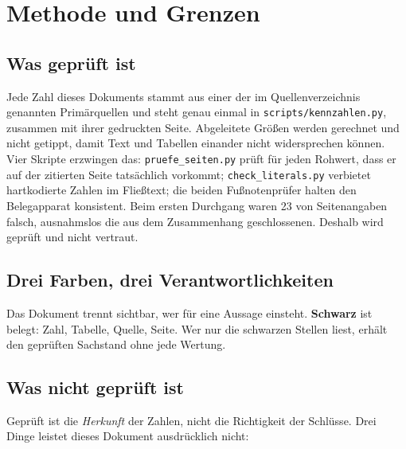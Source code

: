 \section*{Methode und Grenzen}

\subsection*{Was gepr\"uft ist}

Jede Zahl dieses Dokuments stammt aus einer der im Quellenverzeichnis
genannten Prim\"arquellen und steht genau einmal in \texttt{scripts/kennzahlen.py},
zusammen mit ihrer gedruckten Seite. Abgeleitete Gr\"o{\ss}en werden gerechnet und
nicht getippt, damit Text und Tabellen einander nicht widersprechen k\"onnen.
Vier Skripte erzwingen das: \texttt{pruefe\_seiten.py} pr\"uft f\"ur jeden Rohwert,
dass er auf der zitierten Seite tats\"achlich vorkommt; \texttt{check\_literals.py}
verbietet hartkodierte Zahlen im Flie{\ss}text; die beiden Fu{\ss}notenpr\"ufer
halten den Belegapparat konsistent. Beim ersten Durchgang waren
\num{23} von \PruefungAngaben{} Seitenangaben falsch, ausnahmslos die aus dem
Zusammenhang geschlossenen. Deshalb wird geprüft und nicht vertraut.

\subsection*{Drei Farben, drei Verantwortlichkeiten}

Das Dokument trennt sichtbar, wer f\"ur eine Aussage einsteht.
\textbf{Schwarz} ist belegt: Zahl, Tabelle, Quelle, Seite.   Wer nur die schwarzen Stellen
liest, erh\"alt den gepr\"uften Sachstand ohne jede Wertung.

\subsection*{Was nicht gepr\"uft ist}

Gepr\"uft ist die \emph{Herkunft} der Zahlen, nicht die Richtigkeit der
Schl\"usse. Drei Dinge leistet dieses Dokument ausdr\"ucklich nicht:

